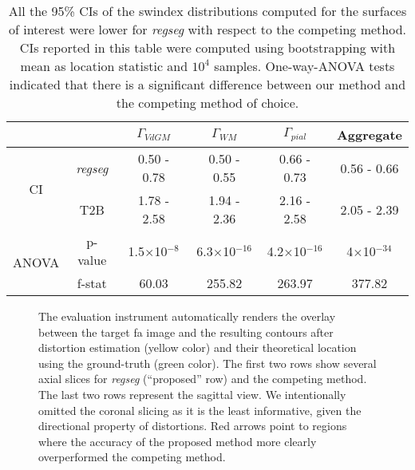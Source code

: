 \begin{table}
		\centering
		\footnotesize
		\tabcolsep=0.05cm
    \begin{tabular}{cccccc}
    & & $\Gamma_{VdGM}$  & $\Gamma_{WM}$ & $\Gamma_{pial}$ & Aggregate \\
    \hline
    \multirow{2}{*}{CI}
       & \emph{regseg}        & 0.50 - 0.78 & 0.50 - 0.55 & 0.66 - 0.73 & 0.56 - 0.66 \\
       & T2B                  & 1.78 - 2.58 & 1.94 - 2.36 & 2.16 - 2.58 & 2.05 - 2.39 \\
    \hline
    \multirow{2}{*}{ANOVA}
       & p-value  & 1.5$\times$10$^{-8}$& 6.3$\times$10$^{-16}$& 4.2$\times$10$^{-16}$ & 4$\times$10$^{-34}$ \\
       & f-stat   & 60.03               & 255.82               & 263.97                & 377.82              \\
    \hline
    \end{tabular}
    \caption{All the 95\% CIs of the \gls*{swindex} distributions computed for the
      surfaces of interest were lower for \emph{regseg} with respect to the competing
      method.
    CIs reported in this table were computed using bootstrapping with mean as location
      statistic and $10^4$ samples.
    One-way-ANOVA tests indicated that there is a significant difference between our method and
      the competing method of choice.
    }\label{tab:results_real}
\end{table}

\begin{figure*}
    \centering
	\caption{The evaluation instrument automatically renders the overlay between the
	  target \gls*{fa} image and the resulting contours after distortion estimation (yellow color) and
	  their theoretical location using the ground-truth (green color).
	The first two rows show several axial slices for \emph{regseg} (``proposed'' row) and the
	  competing method.
	The last two rows represent the sagittal view.
	We intentionally omitted the coronal slicing as it is the least informative, given the directional property
	  of distortions.
	Red arrows point to regions where the accuracy of the proposed method more clearly overperformed
	  the competing method.
	}\label{fig:results_real}
\end{figure*}